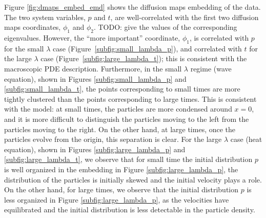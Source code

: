 \documentclass[prl, reprint, final, showkeys]{revtex4-1}
\begin{document}
Figure \ref{fig:dmaps_embed_emd} shows the diffusion maps embedding of the data.
%
The two system variables, $p$ and $t$, are well-correlated with the first two diffusion maps coordinates, $\phi_1$ and $\phi_2$. 
%
TODO: give the values of the corresponding eigenvalues.
However, the ``more important'' coordinate, $\phi_1$, is correlated with $p$ for the small $\lambda$ case (Figure~\ref{subfig:small_lambda_p}), and correlated with $t$ for the large $\lambda$ case (Figure~\ref{subfig:large_lambda_t}); 
this is consistent with the macroscopic PDE description.
%
Furthermore, in the small $\lambda$ regime (wave equation), shown in Figures \ref{subfig:small_lambda_p} and \ref{subfig:small_lambda_t}, the points corresponding to small times are more tightly clustered than the points corresponding to large times.
%
This is consistent with the model: at small times, the particles are more condensed around $x=0$, and it is more difficult to distinguish the particles moving to the left from the particles moving to the right. 
%
On the other hand, at large times, once the particles evolve from the origin, this separation is clear.  
%
For the large $\lambda$ case (heat equation), shown in Figures \ref{subfig:large_lambda_p} and \ref{subfig:large_lambda_t}, we observe that for small time the initial distribution $p$ is well organized in the embedding in Figure \ref{subfig:large_lambda_p}, the distribution of the particles is initially skewed and the initial velocity plays a role. 
%
On the other hand, for large times, we observe that the initial distribution $p$ is less organized in Figure \ref{subfig:large_lambda_p}, as the velocities have equilibrated and the initial distribution is less detectable in the particle density.

\end{document}
